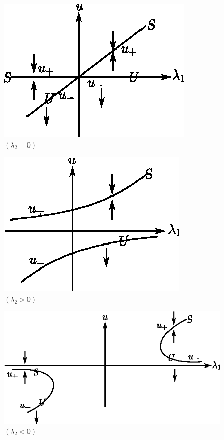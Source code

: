 \begin{center}
\begin{minipage}[c]{5cm}
\begin{figure}[H]
\centering
\includegraphics{vol79-fig/fig1.5a.eps}
\caption{$(\lambda_2=0)$}
\label{chap1-sec1.2-fig1.5}
\end{figure}
\end{minipage}
\qquad
\begin{minipage}[c]{5cm}
\begin{figure}[H]
\centering
\includegraphics{vol79-fig/fig1.5b.eps}
\caption{$(\lambda_2 > 0)$}
\label{chap1-sec1.2-fig1.6}
\end{figure}
\end{minipage}
\end{center}

\begin{figure}[H]
\centering
\includegraphics{vol79-fig/fig79-7.eps}
\smallskip
\caption{$(\lambda_2 < 0)$}
\label{chap1-sec1.2-fig1.7}
\end{figure}

